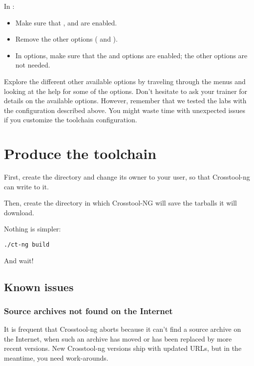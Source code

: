 In :
\begin{itemize}
\item Make sure that ,  and  are
      enabled.
\item Remove the other options ( and ).
\item In  options, make sure that the  and
       options are enabled; the other
      options are not needed.
\end{itemize}

Explore the different other available options by traveling through the
menus and looking at the help for some of the options. Don't hesitate
to ask your trainer for details on the available options. However,
remember that we tested the labs with the configuration described
above. You might waste time with unexpected issues if you customize the
toolchain configuration.

\section{Produce the toolchain}

First, create the directory  and change its
owner to your user, so that Crosstool-ng can write to it.

Then, create the directory  in which Crosstool-NG
will save the tarballs it will download.

Nothing is simpler:

\begin{verbatim}
./ct-ng build
\end{verbatim}

And wait!

\subsection{Known issues}

\subsubsection{Source archives not found on the Internet}

It is frequent that Crosstool-ng aborts because it can't find a
source archive on the Internet, when such an archive has moved or has
been replaced by more recent versions. New Crosstool-ng versions ship
with updated URLs, but in the meantime, you need work-arounds.

